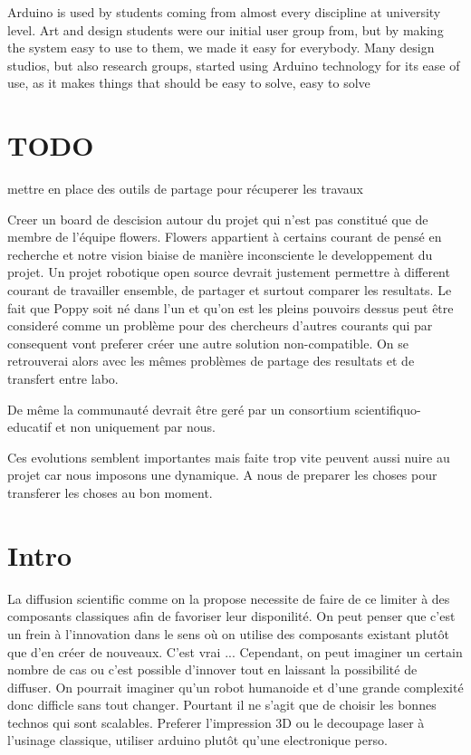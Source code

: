 Arduino is used by students coming from almost every discipline at university level. Art and design students were our initial user group from, but by making the system easy to use to them, we made it easy for everybody. Many design studios, but also research groups, started using Arduino technology for its ease of use, as it makes things that should be easy to solve, easy to solve


\section{TODO} %

mettre en place des outils de partage pour récuperer les travaux


Creer un board de descision autour du projet qui n'est pas constitué que de membre de l'équipe flowers.
Flowers appartient à certains courant de pensé en recherche et notre vision biaise de manière inconsciente le developpement du projet. Un projet robotique open source devrait justement permettre à different courant de travailler ensemble, de partager et surtout comparer les resultats. Le fait que Poppy soit né dans l'un et qu'on est les pleins pouvoirs dessus peut être consideré comme un problème pour des chercheurs d'autres courants qui par consequent vont preferer créer une autre solution non-compatible. On se retrouverai alors avec les mêmes problèmes de partage des resultats et de transfert entre labo.

De même la communauté devrait être geré par un consortium scientifiquo-educatif et non uniquement par nous.

Ces evolutions semblent importantes mais faite trop vite peuvent aussi nuire au projet car nous imposons une dynamique. A nous de preparer les choses pour transferer les choses au bon moment.


\section{Intro} %
La diffusion scientific comme on la propose necessite de faire de ce limiter à des composants classiques afin de favoriser leur disponilité. On peut penser que c'est un frein à l'innovation dans le sens où on utilise des composants existant plutôt que d'en créer de nouveaux. C'est vrai ...
Cependant, on peut imaginer un certain nombre de cas ou c'est possible d'innover tout en laissant la possibilité de diffuser. On pourrait imaginer qu'un robot humanoide et d'une grande complexité donc difficle sans tout changer. Pourtant il ne s'agit que de choisir les bonnes technos qui sont scalables. Preferer l'impression 3D ou le decoupage laser à l'usinage classique, utiliser arduino plutôt qu'une electronique perso.


